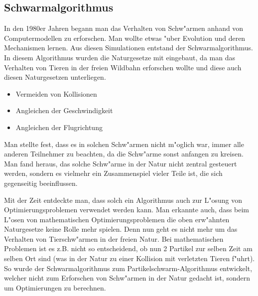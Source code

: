 \subsection{Schwarmalgorithmus}

In den 1980er Jahren begann man das Verhalten von Schw"armen anhand
von Computermodellen zu erforschen. Man wollte etwas "uber Evolution
und deren Mechanismen lernen. Aus diesen Simulationen entstand der
Schwarmalgorithmus.
In diesem Algorithmus wurden die Naturgesetze mit eingebaut, da man das
Verhalten von Tieren in der freien Wildbahn erforschen wollte und diese
auch diesen Naturgesetzen unterliegen.

\begin{itemize}
\item Vermeiden von Kollisionen 
\item Angleichen der Geschwindigkeit
\item Angleichen der Flugrichtung
\end{itemize}

Man stellte fest, dass es in solchen Schw"armen nicht m"oglich war, immer
alle anderen Teilnehmer zu beachten, da die Schw"arme sonst anfangen zu
kreisen. Man fand heraus, das solche Schw"arme in der Natur nicht zentral
gesteuert werden, sondern es vielmehr ein Zusammenspiel vieler Teile ist,
die sich gegenseitig beeinflussen.

Mit der Zeit entdeckte man, dass solch ein Algorithmus auch zur L"osung
von Optimierungsproblemen verwendet werden kann.
Man erkannte auch, dass beim L"osen von mathematischen
Optimierungsproblemen die oben erw"ahnten Naturgesetze keine Rolle mehr
spielen. Denn nun geht es nicht mehr um das Verhalten von Tierschw"armen
in der freien Natur. Bei mathematischen Problemen ist es z.B. nicht
so entscheidend, ob nun 2 Partikel zur selben Zeit am selben Ort sind
(was in der Natur zu einer Kollision mit verletzten Tieren f"uhrt). So
wurde der Schwarmalgorithmus zum Partikelschwarm-Algorithmus entwickelt,
welcher nicht zum Erforschen von Schw"armen in der Natur gedacht ist,
sondern um Optimierungen zu berechnen.
